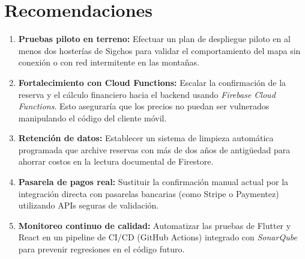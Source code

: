 \documentclass[12pt,letterpaper]{report}
\begin{document}
\chapter{Recomendaciones}
\begin{enumerate}
  \item \textbf{Pruebas piloto en terreno:} Efectuar un plan de despliegue piloto en al menos dos hosterías de Sigchos para validar el comportamiento del mapa sin conexión o con red intermitente en las montañas.
  \item \textbf{Fortalecimiento con Cloud Functions:} Escalar la confirmación de la reserva y el cálculo financiero hacia el backend usando \textit{Firebase Cloud Functions}. Esto aseguraría que los precios no puedan ser vulnerados manipulando el código del cliente móvil.
  \item \textbf{Retención de datos:} Establecer un sistema de limpieza automática programada que archive reservas con más de dos años de antigüedad para ahorrar costos en la lectura documental de Firestore.
  \item \textbf{Pasarela de pagos real:} Sustituir la confirmación manual actual por la integración directa con pasarelas bancarias (como Stripe o Paymentez) utilizando APIs seguras de validación.
  \item \textbf{Monitoreo continuo de calidad:} Automatizar las pruebas de Flutter y React en un pipeline de CI/CD (GitHub Actions) integrado con \textit{SonarQube} para prevenir regresiones en el código futuro.
\end{enumerate}
\end{document}
